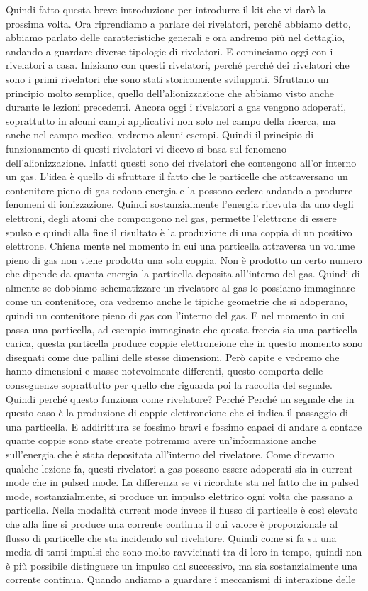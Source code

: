 Quindi fatto questa breve introduzione per introdurre il kit che vi darò la prossima volta. Ora riprendiamo a parlare dei rivelatori, perché abbiamo detto, abbiamo parlato delle caratteristiche generali e ora andremo più nel dettaglio, andando a guardare diverse tipologie di rivelatori. E cominciamo oggi con i rivelatori a casa. Iniziamo con questi rivelatori, perché perché dei rivelatori che sono i primi rivelatori che sono stati storicamente sviluppati. Sfruttano un principio molto semplice, quello dell'alionizzazione che abbiamo visto anche durante le lezioni precedenti. Ancora oggi i rivelatori a gas vengono adoperati, soprattutto in alcuni campi applicativi non solo nel campo della ricerca, ma anche nel campo medico, vedremo alcuni esempi. Quindi il principio di funzionamento di questi rivelatori vi dicevo si basa sul fenomeno dell'alionizzazione. Infatti questi sono dei rivelatori che contengono all'or interno un gas. L'idea è quello di sfruttare il fatto che le particelle che attraversano un contenitore pieno di gas cedono energia e la possono cedere andando a produrre fenomeni di ionizzazione. Quindi sostanzialmente l'energia ricevuta da uno degli elettroni, degli atomi che compongono nel gas, permette l'elettrone di essere spulso e quindi alla fine il risultato è la produzione di una coppia di un positivo elettrone. Chiena mente nel momento in cui una particella attraversa un volume pieno di gas non viene prodotta una sola coppia. Non è prodotto un certo numero che dipende da quanta energia la particella deposita all'interno del gas. Quindi di almente se dobbiamo schematizzare un rivelatore al gas lo possiamo immaginare come un contenitore, ora vedremo anche le tipiche geometrie che si adoperano, quindi un contenitore pieno di gas con l'interno del gas. E nel momento in cui passa una particella, ad esempio immaginate che questa freccia sia una particella carica, questa particella produce coppie elettroneione che in questo momento sono disegnati come due pallini delle stesse dimensioni. Però capite e vedremo che hanno dimensioni e masse notevolmente differenti, questo comporta delle conseguenze soprattutto per quello che riguarda poi la raccolta del segnale. Quindi perché questo funziona come rivelatore? Perché Perché un segnale che in questo caso è la produzione di coppie elettroneione che ci indica il passaggio di una particella. E addirittura se fossimo bravi e fossimo capaci di andare a contare quante coppie sono state create potremmo avere un'informazione anche sull'energia che è stata depositata all'interno del rivelatore. Come dicevamo qualche lezione fa, questi rivelatori a gas possono essere adoperati sia in current mode che in pulsed mode. La differenza se vi ricordate sta nel fatto che in pulsed mode, sostanzialmente, si produce un impulso elettrico ogni volta che passano a particella. Nella modalità current mode invece il flusso di particelle è così elevato che alla fine si produce una corrente continua il cui valore è proporzionale al flusso di particelle che sta incidendo sul rivelatore. Quindi come si fa su una media di tanti impulsi che sono molto ravvicinati tra di loro in tempo, quindi non è più possibile distinguere un impulso dal successivo, ma sia sostanzialmente una corrente continua. Quando andiamo a guardare i meccanismi di interazione delle 